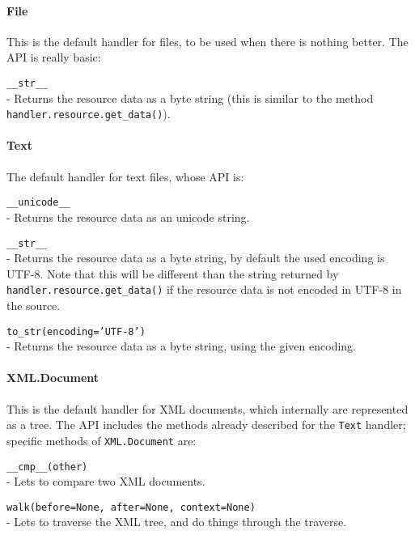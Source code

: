 \paragraph{File}

This is the default handler for files, to be used when there is nothing
better. The API is really basic:

\begin{api}
  {\tt \_\_str\_\_}\\
  - Returns the resource data as a byte string (this is similar to the
    method {\tt handler.resource.get\_data()}).
\end{api}

\paragraph{Text}

The default handler for text files, whose API is:

\begin{api}
  {\tt \_\_unicode\_\_}\\
  - Returns the resource data as an unicode string.

  {\tt \_\_str\_\_}\\
  - Returns the resource data as a byte string, by default the used
  encoding is UTF-8. Note that this will be different than the string
  returned by {\tt handler.resource.get\_data()} if the resource data
  is not encoded in UTF-8 in the source.

  {\tt to\_str(encoding='UTF-8')}\\
  - Returns the resource data as a byte string, using the given encoding.
\end{api}

\paragraph{XML.Document}

This is the default handler for XML documents, which internally are
represented as a tree. The API includes the methods already described
for the {\tt Text} handler; specific methods of {\tt XML.Document} are:

\begin{api}
  {\tt \_\_cmp\_\_(other)}\\
  - Lets to compare two XML documents.

  {\tt walk(before=None, after=None, context=None)}\\
  - Lets to traverse the XML tree, and do things through the traverse.
\end{api}

